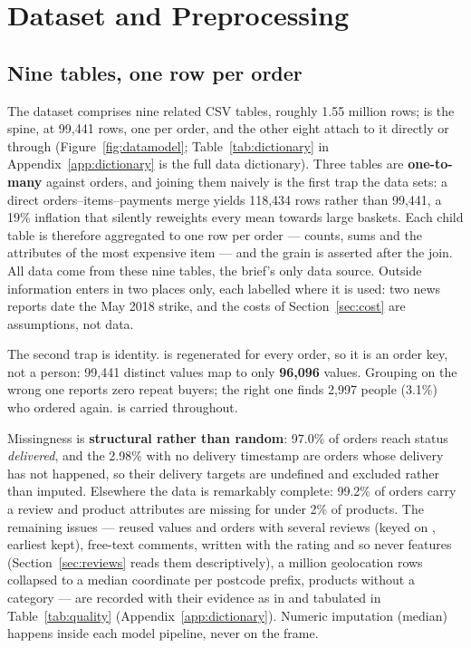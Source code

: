 \section{Dataset and Preprocessing}
\label{sec:data}

\subsection{Nine tables, one row per order}

The dataset \citep{olist2018dataset} comprises nine related CSV tables, roughly
1.55 million rows;  is the spine, at 99{,}441 rows, one per order,
and the other eight attach to it directly or through 
(Figure~\ref{fig:datamodel}; Table~\ref{tab:dictionary} in
Appendix~\ref{app:dictionary} is the full data dictionary). Three tables are
\textbf{one-to-many} against orders, and joining them naively is the first trap
the data sets: a direct orders--items--payments merge yields 118{,}434 rows
rather than 99{,}441, a 19\% inflation that silently reweights every mean
towards large baskets. Each child table is therefore aggregated to one row per
order --- counts, sums and the attributes of the most expensive item --- and
the grain is asserted after the join. All data come from these nine tables, the
brief's only data source. Outside information enters in two places only, each
labelled where it is used: two news reports date the May 2018 strike, and the
costs of Section~\ref{sec:cost} are assumptions, not data.

The second trap is identity.  is regenerated for every
order, so it is an order key, not a person: 99{,}441 distinct values map to only
\textbf{96{,}096}  values. Grouping on the wrong one
reports zero repeat buyers; the right one finds 2{,}997 people (3.1\%) who
ordered again.  is carried throughout.

Missingness is \textbf{structural rather than random}: 97.0\% of orders reach
status \emph{delivered}, and the 2.98\% with no delivery timestamp are orders
whose delivery has not happened, so their delivery targets are undefined and
excluded rather than imputed. Elsewhere the data is remarkably complete: 99.2\%
of orders carry a review and product attributes are missing for under 2\% of
products. The remaining issues --- reused  values and orders
with several reviews (keyed on , earliest kept), free-text
comments, written with the rating and so never features
(Section~\ref{sec:reviews} reads them descriptively), a million geolocation rows
collapsed to a median coordinate per postcode prefix, products without a
category --- are recorded with their evidence as  in
 and tabulated in Table~\ref{tab:quality}
(Appendix~\ref{app:dictionary}).
Numeric imputation (median) happens inside each model pipeline, never on the
frame.

